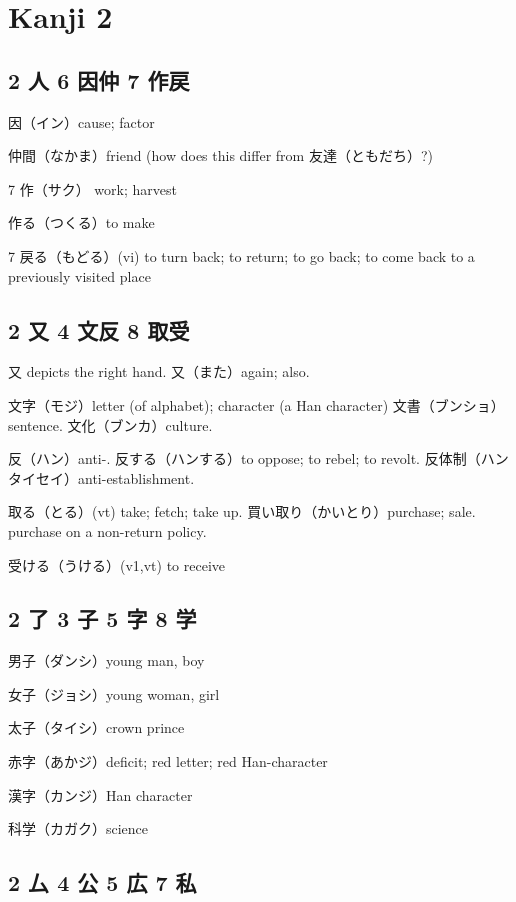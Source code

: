 \chapter{Kanji 2}

\section{2 人 6 因仲 7 作戻}

因（イン）cause; factor

仲間（なかま）friend (how does this differ from 友達（ともだち）?)

7 作（サク） work; harvest

作る（つくる）to make

7 戻る（もどる）(vi) to turn back; to return; to go back;
to come back to a previously visited place

\section{2 又 4 文反 8 取受}

又 depicts the right hand.
又（また）again; also.

文字（モジ）letter (of alphabet); character (a Han character)
文書（ブンショ）sentence.
文化（ブンカ）culture.

反（ハン）anti-.
反する（ハンする）to oppose; to rebel; to revolt.
反体制（ハンタイセイ）anti-establishment.

取る（とる）(vt) take; fetch; take up.
買い取り（かいとり）purchase; sale. purchase on a non-return policy.


受ける（うける）(v1,vt) to receive

\section{2 了 3 子 5 字 8 学}

男子（ダンシ）young man, boy

女子（ジョシ）young woman, girl

太子（タイシ）crown prince

赤字（あかジ）deficit; red letter; red Han-character

漢字（カンジ）Han character

科学（カガク）science

\section{2 厶 4 公 5 広 7 私}

